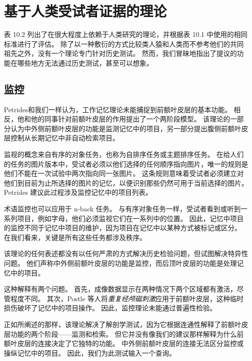 \section{基于人类受试者证据的理论}

表 10.2 列出了在很大程度上依赖于人类研究的理论，并根据表 10.1 中使用的相同标准进行了评估。
除了以一种敷衍的方式比较类人猿和人类而不参考他们的共同祖先之外，没有一个理论专门针对历史测试。
然而，我们冒昧地指出了提议的功能在哪些地方无法通过历史测试，甚至可以想象。



\subsection{监控}

Petrides\cite{petrides1994frontal}和我们一样认为，工作记忆理论未能捕捉到前额叶皮层的基本功能。
相反，他和他的同事针对前额叶皮层的作用提出了一个两阶段模型\cite{owen1996evidence}。
该理论的一部分认为中外侧前额叶皮层的功能是监测记忆中的项目，另一部分提出腹侧前额叶皮层控制从长期记忆中非自动检索项目。
\par


监视的概念来自有序的对象任务，也称为自排序任务或主题排序任务。
在给人们的任务的图片版本中，受试者必须以他们选择的任何顺序指向图片，唯一的规则是他们不能在一次试验中两次指向同一张图片。
这条规则意味着受试者必须建立对他们到目前为止所选择的图片的记忆，以便识别那些仍然可用于当前选择的图片。
Petrides 建议此过程涉及监控记忆中的项目列表。
\par


术语监控也可以应用于 n-back 任务。
与有序对象任务一样，受试者看到或听到一系列项目，例如字母，他们必须监视它们在一系列中的位置。
因此，记忆中项目的监控不同于记忆中项目的维护，因为项目在记忆中以某种方式被标记或区分。
在我们看来，关键是所有这些任务都涉及秩序。
\par


该理论的任何表述都没有以任何严肃的方式解决历史检验问题，但\cite{champod2007dissociable}试图解决特异性问题。
他们声称中外侧前额叶皮层的功能是监控，而后顶叶皮层的功能是处理记忆中的项目。
\par


这种解释有两个问题。
首先，成像数据显示在两种情况下两个区域都有激活，尽管程度不同。
其次，Postle 等人\cite{postle2006repetitive}将\textit{重复经颅磁刺激}应用于前额叶皮层，这种临时损伤破坏了记忆中的项目操作。
因此，监控理论未能通过普遍性检验。
\par


正如所阐述的那样，该理论解决了解剖学测试，因为它根据连通性解释了前额叶皮层功能的两个阶段——监测和检索。
但它并没有像我们的建议那样解释为什么前额叶皮层的连接决定了它独特的功能。
中外侧前额叶皮层的连接无法区分监控或操纵记忆中的项目。
因此，我们为此测试输入一个查询。




